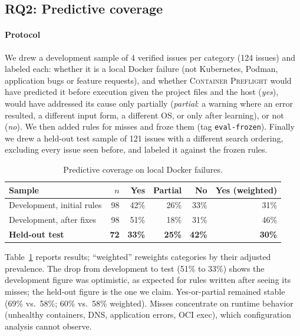 \documentclass[preprint,12pt]{elsarticle}
\newcommand{\tool}{\textsc{Container Preflight}}
\begin{document}


\subsection{RQ2: Predictive coverage}
\paragraph{Protocol} We drew a development sample of 4 verified issues per category (124 issues) and labeled each: whether it is a local Docker failure (not Kubernetes, Podman, application bugs or feature requests), and whether \tool{} would have predicted it before execution given the project files and the host (\emph{yes}), would have addressed its cause only partially (\emph{partial}: a warning where an error resulted, a different input form, a different OS, or only after learning), or not (\emph{no}). We then added rules for misses and froze them (tag \texttt{eval-frozen}). Finally we drew a held-out test sample of 121 issues with a different search ordering, excluding every issue seen before, and labeled it against the frozen rules.

\begin{table}[t]
\centering\footnotesize
\caption{Predictive coverage on local Docker failures.}
\label{tab:coverage}
\begin{tabular}{@{}lrrrrr@{}}
\toprule
Sample & $n$ & Yes & Partial & No & Yes (weighted) \\
\midrule
Development, initial rules & 98 & 42\% & 26\% & 33\% & 31\% \\
Development, after fixes   & 98 & 51\% & 18\% & 31\% & 46\% \\
\textbf{Held-out test}     & \textbf{72} & \textbf{33\%} & \textbf{25\%} & \textbf{42\%} & \textbf{30\%} \\
\bottomrule
\end{tabular}
\end{table}

Table~\ref{tab:coverage} reports results; ``weighted'' reweights categories by their adjusted prevalence. The drop from development to test (51\% to 33\%) shows the development figure was optimistic, as expected for rules written after seeing its misses; the held-out figure is the one we claim. Yes-or-partial remained stable (69\% vs.\ 58\%; 60\% vs.\ 58\% weighted). Misses concentrate on runtime behavior (unhealthy containers, DNS, application errors, OCI exec), which configuration analysis cannot observe.
\end{document}
